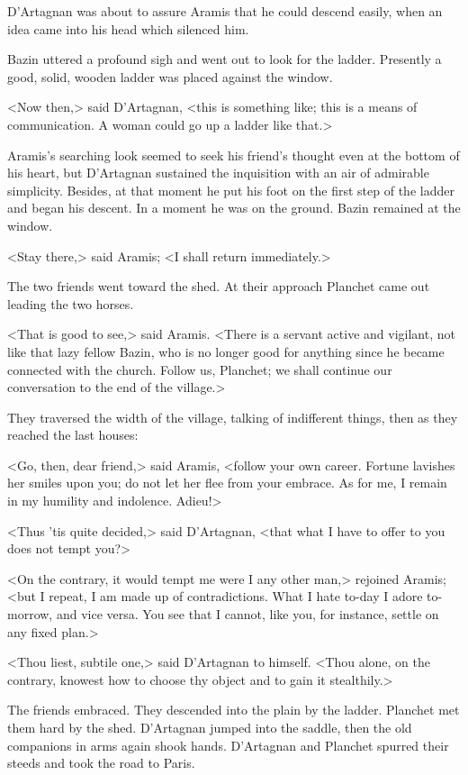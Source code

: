 D'Artagnan was about to assure Aramis that he could descend easily, when an idea came into his head which silenced him.

Bazin uttered a profound sigh and went out to look for the ladder. Presently a good, solid, wooden ladder was placed against the window.

<Now then,> said D'Artagnan, <this is something like; this is a means of communication. A woman could go up a ladder like that.>

Aramis's searching look seemed to seek his friend's thought even at the bottom of his heart, but D'Artagnan sustained the inquisition with an air of admirable simplicity. Besides, at that moment he put his foot on the first step of the ladder and began his descent. In a moment he was on the ground. Bazin remained at the window.

<Stay there,> said Aramis; <I shall return immediately.>

The two friends went toward the shed. At their approach Planchet came out leading the two horses.

<That is good to see,> said Aramis. <There is a servant active and vigilant, not like that lazy fellow Bazin, who is no longer good for anything since he became connected with the church. Follow us, Planchet; we shall continue our conversation to the end of the village.>

They traversed the width of the village, talking of indifferent things, then as they reached the last houses:

<Go, then, dear friend,> said Aramis, <follow your own career. Fortune lavishes her smiles upon you; do not let her flee from your embrace. As for me, I remain in my humility and indolence. Adieu!>

<Thus 'tis quite decided,> said D'Artagnan, <that what I have to offer to you does not tempt you?>

<On the contrary, it would tempt me were I any other man,> rejoined Aramis; <but I repeat, I am made up of contradictions. What I hate to-day I adore to-morrow, and vice versa. You see that I cannot, like you, for instance, settle on any fixed plan.>

<Thou liest, subtile one,> said D'Artagnan to himself. <Thou alone, on the contrary, knowest how to choose thy object and to gain it stealthily.>

The friends embraced. They descended into the plain by the ladder. Planchet met them hard by the shed. D'Artagnan jumped into the saddle, then the old companions in arms again shook hands. D'Artagnan and Planchet spurred their steeds and took the road to Paris.


